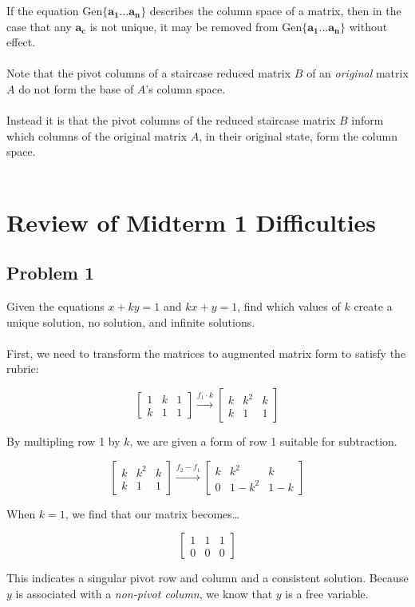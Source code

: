 \documentclass[12pt]{article}
\newcommand{\gen}[1]{\mathrm{Gen}\{{#1}\}}
\newcommand{\bm}[1]{\mathbf{{#1}}}
\newcommand{\mb}{\begin{bmatrix}}
\newcommand{\me}{\end{bmatrix}}
\begin{document}
If the equation $\gen{\bm{a_1\dots a_n}}$ describes the column space of a matrix, then in the case that any $\bm{a_c}$ is not unique, it may be removed from $\gen{\bm{a_1\dots a_n}}$ without effect. \\ \\

Note that the pivot columns of a staircase reduced matrix $B$ of an \emph{original} matrix $A$ do not form the base of $A$'s column space. \\ \\

Instead it is that the pivot columns of the reduced staircase matrix $B$ inform which columns of the original matrix $A$,
in their original state, form the column space. \\ \\

\section*{Review of Midterm 1 Difficulties}

\subsection*{Problem 1}

Given the equations $x + ky = 1$ and $kx + y = 1$, find which values of $k$ create a unique solution, no solution, and infinite solutions. \\ \\

First, we need to transform the matrices to augmented matrix form to satisfy the rubric:

$$\mb 1 & k & 1 \\ k & 1 & 1 \me \xrightarrow{f_1 \cdot k} \mb k & k^2 & k \\ k & 1 & 1 \me$$

By multipling row 1 by $k$, we are given a form of row 1 suitable for subtraction.

$$\mb k & k^2 & k \\ k & 1 & 1 \me \xrightarrow{f_2 - f_1} \mb k & k^2 & k \\ 0 & 1 - k^2 & 1 -k \me$$

When $k = 1$, we find that our matrix becomes\dots

$$\mb 1 & 1 & 1 \\ 0 & 0 & 0 \me$$

This indicates a singular pivot row and column and a consistent solution.
Because $y$ is associated with a \emph{non-pivot column}, we know that $y$ is a free variable. \\ \\
\end{document}
